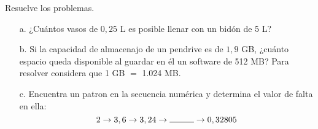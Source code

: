 \documentclass[spanish,letterpaper, 11pt, addpoints, answers]{exam}
\begin{document}
\begin{questions}
\begin{itemize}
        \end{itemize}
        
      

      \question Resuelve los problemas.

\begin{itemize}
  \item[a.] ¿Cuántos vasos de $0,25$ L es posible llenar con un bidón de 5 L?
  \item[b.] Si la capacidad de almacenajo de un pendrive es de $1,9$ GB, ¿cuánto espacio queda disponible al guardar en él un software de 512 MB? Para resolver considera que 1 GB $=$ 1.024 MB.
  \item[c.] Encuentra un patron en la secuencia numérica y determina el valor de falta en ella:
  $$2\rightarrow 3,6\rightarrow 3,24\rightarrow \rule{1cm}{0.4pt}\rightarrow 0,32805$$ 
\end{itemize}  

\end{questions}
\end{document}
